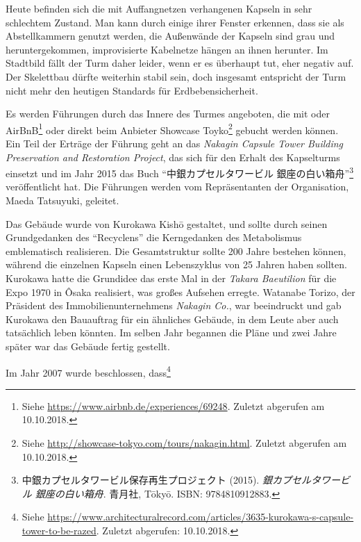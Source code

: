 \documentclass[a4paper, 12pt]{article}
\begin{document}
\begin{onehalfspace}
Heute befinden sich die mit Auffangnetzen verhangenen Kapseln in sehr schlechtem Zustand. Man kann durch einige ihrer Fenster erkennen, dass sie als Abstellkammern genutzt werden, die Außenwände der Kapseln sind grau und heruntergekommen, improvisierte Kabelnetze hängen an ihnen herunter. Im Stadtbild fällt der Turm daher leider, wenn er es überhaupt tut, eher negativ auf. Der Skelettbau dürfte weiterhin stabil sein, doch insgesamt entspricht der Turm nicht mehr den heutigen Standards für Erdbebensicherheit.

Es werden Führungen durch das Innere des Turmes angeboten, die mit oder AirBnB\footnote{Siehe \url{https://www.airbnb.de/experiences/69248}. Zuletzt abgerufen am 10.10.2018.} oder direkt beim Anbieter Showcase Toyko\footnote{Siehe \url{http://showcase-tokyo.com/tours/nakagin.html}. Zuletzt abgerufen am 10.10.2018.} gebucht werden können. Ein Teil der Erträge der Führung geht an das \emph{Nakagin Capsule Tower Building Preservation and Restoration Project}, das sich für den Erhalt des Kapselturms einsetzt und im Jahr 2015 das Buch "`中銀カプセルタワービル 銀座の白い箱舟"'\footnote{中銀カプセルタワービル保存再生プロジェクト (2015). \emph{銀カプセルタワービル 銀座の白い箱舟}. 青月社, Tōkyō. ISBN: 9784810912883.} veröffentlicht hat. Die Führungen werden vom Repräsentanten der Organisation, Maeda Tatsuyuki, geleitet.

Das Gebäude wurde von Kurokawa Kishō gestaltet, und sollte durch seinen Grundgedanken des "`Recyclens"' die Kerngedanken des Metabolismus emblematisch realisieren. Die Gesamtstruktur sollte 200 Jahre bestehen können, während die einzelnen Kapseln einen Lebenszyklus von 25 Jahren haben sollten. Kurokawa hatte die Grundidee das erste Mal in der \emph{Takara Baeutilion} für die Expo 1970 in Ôsaka realisiert, was großes Aufsehen erregte. Watanabe Torizo, der Präsident des Immobilienunternehmens \emph{Nakagin Co.}, war beeindruckt und gab Kurokawa den Bauauftrag für ein ähnliches Gebäude, in dem Leute aber auch tatsächlich leben könnten. Im selben Jahr begannen die Pläne und zwei Jahre später war das Gebäude fertig gestellt. 

Im Jahr 2007 wurde beschlossen, dass\footnote{Siehe \url{https://www.architecturalrecord.com/articles/3635-kurokawa-s-capsule-tower-to-be-razed}. Zuletzt abgerufen: 10.10.2018.}


\end{onehalfspace}
\end{document}
